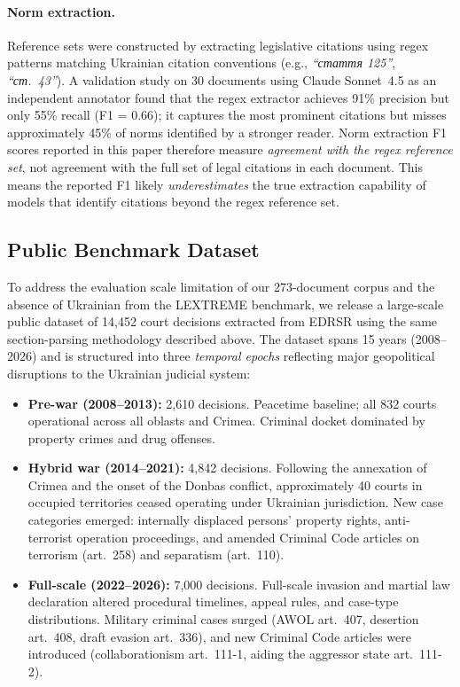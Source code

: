 \documentclass[11pt,a4paper]{article}
\begin{document}
\paragraph{Norm extraction.} Reference sets were constructed by extracting legislative citations using regex patterns matching Ukrainian citation conventions (e.g., \foreignlanguage{ukrainian}{\textit{``стаття 125''}}, \foreignlanguage{ukrainian}{\textit{``ст.~43''}}). A validation study on 30 documents using Claude Sonnet~4.5 as an independent annotator found that the regex extractor achieves 91\% precision but only 55\% recall (F1 = 0.66); it captures the most prominent citations but misses approximately 45\% of norms identified by a stronger reader. Norm extraction F1 scores reported in this paper therefore measure \emph{agreement with the regex reference set}, not agreement with the full set of legal citations in each document. This means the reported F1 likely \emph{underestimates} the true extraction capability of models that identify citations beyond the regex reference set.

\subsection{Public Benchmark Dataset}
\label{sec:public_dataset}

To address the evaluation scale limitation of our 273-document corpus and the absence of Ukrainian from the LEXTREME benchmark, we release a large-scale public dataset of 14,452 court decisions extracted from EDRSR using the same section-parsing methodology described above. The dataset spans 15 years (2008--2026) and is structured into three \emph{temporal epochs} reflecting major geopolitical disruptions to the Ukrainian judicial system:

\begin{itemize}[leftmargin=*]
    \item \textbf{Pre-war (2008--2013):} 2,610 decisions. Peacetime baseline; all 832 courts operational across all oblasts and Crimea. Criminal docket dominated by property crimes and drug offenses.
    \item \textbf{Hybrid war (2014--2021):} 4,842 decisions. Following the annexation of Crimea and the onset of the Donbas conflict, approximately 40 courts in occupied territories ceased operating under Ukrainian jurisdiction. New case categories emerged: internally displaced persons' property rights, anti-terrorist operation proceedings, and amended Criminal Code articles on terrorism (art.~258) and separatism (art.~110).
    \item \textbf{Full-scale (2022--2026):} 7,000 decisions. Full-scale invasion and martial law declaration altered procedural timelines, appeal rules, and case-type distributions. Military criminal cases surged (AWOL art.~407, desertion art.~408, draft evasion art.~336), and new Criminal Code articles were introduced (collaborationism art.~111-1, aiding the aggressor state art.~111-2).
\end{itemize}
\end{document}
